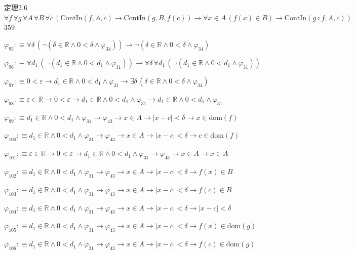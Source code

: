 \begin{fullproof}{定理2.6}{$\forall f\,\forall g\,\forall A\,\forall B\,\forall c\,(\mathrm{ContIn}(f,A,c) \to \mathrm{ContIn}(g,B,f(c)) \to \forall x \in A\,(f(x) \in B) \to \mathrm{ContIn}(g \circ f,A,c))$}{359}
\begin{abbrevlist}
\item $\varphi_{95} :\equiv \forall \delta\,(\neg (\delta \in \mathbb{R} \land 0 < \delta \land \varphi_{34})) \to \neg (\delta \in \mathbb{R} \land 0 < \delta \land \varphi_{34})$
\item $\varphi_{96} :\equiv \forall d_{1}\,(\neg (d_{1} \in \mathbb{R} \land 0 < d_{1} \land \varphi_{31})) \to \forall \delta\,\forall d_{1}\,(\neg (d_{1} \in \mathbb{R} \land 0 < d_{1} \land \varphi_{31}))$
\item $\varphi_{97} :\equiv 0 < \varepsilon \to d_{1} \in \mathbb{R} \land 0 < d_{1} \land \varphi_{31} \to \exists \delta\,(\delta \in \mathbb{R} \land 0 < \delta \land \varphi_{34})$
\item $\varphi_{98} :\equiv \varepsilon \in \mathbb{R} \to 0 < \varepsilon \to d_{1} \in \mathbb{R} \land 0 < d_{1} \land \varphi_{31} \to d_{1} \in \mathbb{R} \land 0 < d_{1} \land \varphi_{31}$
\item $\varphi_{99} :\equiv d_{1} \in \mathbb{R} \land 0 < d_{1} \land \varphi_{31} \to \varphi_{43} \to x \in A \to \lvert x - c \rvert < \delta \to x \in \mathrm{dom}(f)$
\item $\varphi_{100} :\equiv d_{1} \in \mathbb{R} \land 0 < d_{1} \land \varphi_{31} \to \varphi_{43} \to x \in A \to \lvert x - c \rvert < \delta \to c \in \mathrm{dom}(f)$
\item $\varphi_{101} :\equiv \varepsilon \in \mathbb{R} \to 0 < \varepsilon \to d_{1} \in \mathbb{R} \land 0 < d_{1} \land \varphi_{31} \to \varphi_{43} \to x \in A \to x \in A$
\item $\varphi_{102} :\equiv d_{1} \in \mathbb{R} \land 0 < d_{1} \land \varphi_{31} \to \varphi_{43} \to x \in A \to \lvert x - c \rvert < \delta \to f(x) \in B$
\item $\varphi_{103} :\equiv d_{1} \in \mathbb{R} \land 0 < d_{1} \land \varphi_{31} \to \varphi_{43} \to x \in A \to \lvert x - c \rvert < \delta \to f(c) \in B$
\item $\varphi_{104} :\equiv d_{1} \in \mathbb{R} \land 0 < d_{1} \land \varphi_{31} \to \varphi_{43} \to x \in A \to \lvert x - c \rvert < \delta \to \lvert x - c \rvert < \delta$
\item $\varphi_{105} :\equiv d_{1} \in \mathbb{R} \land 0 < d_{1} \land \varphi_{31} \to \varphi_{43} \to x \in A \to \lvert x - c \rvert < \delta \to f(x) \in \mathrm{dom}(g)$
\item $\varphi_{106} :\equiv d_{1} \in \mathbb{R} \land 0 < d_{1} \land \varphi_{31} \to \varphi_{43} \to x \in A \to \lvert x - c \rvert < \delta \to f(c) \in \mathrm{dom}(g)$

\end{abbrevlist}
\end{fullproof}
